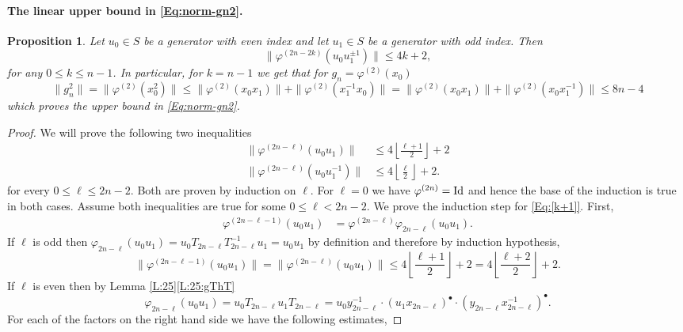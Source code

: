 \documentclass[12pt,reqno,a4paper]{article}
\newtheorem{proposition}[theorem]{Proposition}
\theoremstyle{definition}
\theoremstyle{remark}
\numberwithin{equation}{section}
\numberwithin{figure}{section}
\begin{document}
\paragraph{The linear upper bound in \eqref{Eq:norm-gn2}.}
\begin{proposition}\label{P:fiuu}
Let $u_0\in S$ be a generator with even index and let $u_1\in S$ be a generator with odd index. 
Then
$$
\|\varphi^{(2n-2k)}(u_0u_1^{\pm 1})\| \leq 4k+2,
$$
for any $0\leq k \leq n-1$.
In particular, for $k=n-1$ we get that for $g_n=\varphi^{(2)}(x_0)$
\[
\|g_n^2\|= \| \varphi^{(2)}(x_0^2)\| \leq \| \varphi^{(2)}(x_0 x_1)\| + \| \varphi^{(2)}(x_1^{-1}x_0) \| = \| \varphi^{(2)}(x_0 x_1)\| + \| \varphi^{(2)}(x_0x_1^{-1}) \|  \leq 8n-4
\]
which proves the upper bound in \eqref{Eq:norm-gn2}.
\end{proposition}
\begin{proof}
We will prove the following two inequalities
\begin{align}
\|\varphi^{(2n-\ell)}(u_0u_1)\| &\leq 4 \left\lfloor \frac{\ell+1}{2}\right\rfloor + 2\label{Eq:[k+1]}\\
\|\varphi^{(2n-\ell)}(u_0u_1^{-1})\| &\leq 4 \left\lfloor \frac{\ell}{2}\right\rfloor + 2\label{Eq:[k]}.
\end{align}
for every $0\leq \ell\leq 2n-2$. Both are proven by induction on $\ell$. For $\ell=0$ we have
$\varphi^{(2n)}={\rm Id}$ and hence the base of the induction is true in both cases.
Assume both inequalities are true for some $0\leq \ell < 2n-2$.
We prove the induction step for \eqref{Eq:[k+1]}.
First,
\begin{align*}
\varphi^{(2n-\ell-1)}(u_0u_1) 
&= \varphi^{(2n-\ell)}\varphi_{2n-\ell}(u_0u_1).
\end{align*}
If $\ell$ is odd then 
$\varphi_{2n-\ell}(u_0u_1) = u_0T_{2n-\ell}T_{2n-\ell}^{-1}u_1=u_0u_1$ 
by definition and therefore by induction hypothesis,
\begin{equation}
\|\varphi^{(2n-\ell-1)}(u_0u_1)\| = \|\varphi^{(2n-\ell)}(u_0u_1)\| 
\leq 4 \left\lfloor \frac{\ell+1}{2}\right\rfloor +2 
=4 \left\lfloor \frac{\ell+2}{2}\right\rfloor+2.
\label{Eq:lodd}
\end{equation}
If $\ell$ is even then by Lemma \ref{L:25}\ref{L:25:gThT}
$$
\varphi_{2n-\ell}(u_0u_1)
=u_0T_{2n-\ell}u_1T_{2n-\ell} 
=u_0y_{2n-\ell}^{-1}\cdot (u_1x_{2n-\ell})^{\bullet}
\cdot (y_{2n-\ell}x_{2n-\ell}^{-1})^{\bullet}.
$$
For each of the factors on the right hand side we have the following estimates,

\end{proof}
\end{document}
